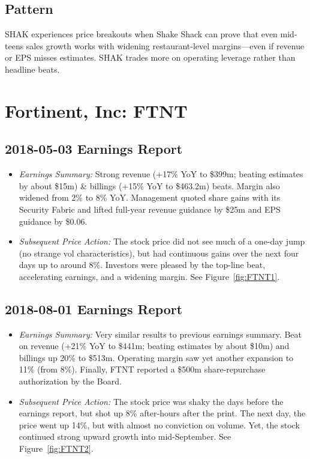 \documentclass[11pt]{article}
\begin{document}
    \subsection{Pattern}
        SHAK experiences price breakouts when Shake Shack can prove that even mid-teens sales growth works with widening restaurant-level margins---even if revenue or EPS misses estimates. SHAK trades more on operating leverage rather than headline beats.
\section{Fortinent, Inc: FTNT}
    \subsection{2018-05-03 Earnings Report}
        \begin{itemize}
            \item \textit{Earnings Summary:} Strong revenue (+17\% YoY to \$399m; beating estimates by about \$15m) \& billings (+15\% YoY to \$463.2m) beats. Margin also widened from 2\% to 8\% YoY. Management quoted share gains with its Security Fabric and lifted full-year revenue guidance by \$25m and EPS guidance by \$0.06.
            \item \textit{Subsequent Price Action:} The stock price did not see much of a one-day jump (no strange vol characteristics), but had continuous gains over the next four days up to around 8\%. Investors were pleased by the top-line beat, accelerating earnings, and a widening margin. See Figure~\ref{fig:FTNT1}.
        \end{itemize}
    \subsection{2018-08-01 Earnings Report}
        \begin{itemize}
            \item \textit{Earnings Summary:} Very similar results to previous earnings summary. Beat on revenue (+21\% YoY to \$441m; beating estimates by about \$10m) and billings up 20\% to \$513m. Operating margin saw yet another expansion to 11\% (from 8\%). Finally, FTNT reported a \$500m share-repurchase authorization by the Board.
            \item \textit{Subsequent Price Action:} The stock price was shaky the days before the earnings report, but shot up 8\% after-hours after the print. The next day, the price went up 14\%, but with almost no conviction on volume. Yet, the stock continued strong upward growth into mid-September. See Figure~\ref{fig:FTNT2}.
        \end{itemize}
\end{document}

